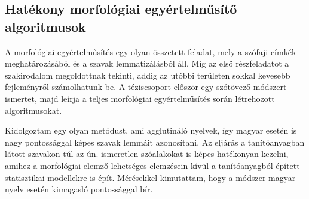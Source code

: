 \let\oldthesubsection=\thesubsection
\renewcommand{\thesubsection}{\Roman{subsection}}



\subsection{Hatékony morfológiai egyértelműsítő algoritmusok}
\label{thes:morf}

A morfológiai egyértelműsítés egy olyan összetett feladat, mely a szófaji címkék meghatározásából és a szavak lemmatizálásból áll. 
Míg az első részfeladatot a szakirodalom megoldottnak tekinti, addig az utóbbi területen sokkal kevesebb fejleményről számolhatunk be. 
A téziscsoport először egy szótövező módszert ismertet, majd leírja a teljes morfológiai egyértelműsítés során létrehozott algoritmusokat.

\begin{core}
\begin{thesis}\label{thes:morf-lemma}
Kidolgoztam egy olyan metódust, ami agglutináló nyelvek, így magyar esetén is nagy pontossággal képes szavak lemmáit azonosítani. 
Az eljárás a tanítóanyagban látott szavakon túl az ún. ismeretlen szóalakokat is képes hatékonyan kezelni, amihez a morfológiai elemző lehetséges elemzésein kívül a tanítóanyagból épített statisztikai modellekre is épít. 
Mérésekkel kimutattam, hogy a módszer magyar nyelv esetén kimagasló pontossággal bír. 
\end{thesis} 

\begin{pub}
\cite{Orosz2011,Orosz2012,Orosz2012a,Orosz2013a}
\end{pub}
\end{core}

